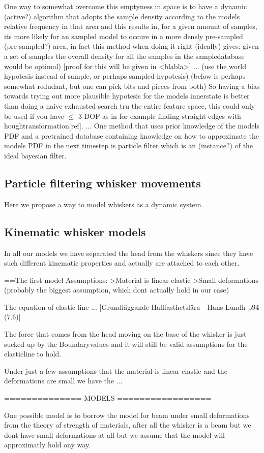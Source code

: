 One way to somewhat overcome this emptyness in space is to have a dynamic (active?) algorithm that adopts the sample density 
according to the models relative frequency in that area and this results in, for a given amount of samples, its more likely 
for an sampled model to occure in a more densly pre-sampled (pre-sampled?) area, in fact this method when doing it right (ideally) 
gives: given a set of samples the overall density for all the samples in the sampledatabase would be optimal) [proof for this will be given in <blabla>]
... (use the world hypotesis instead of sample, or perhaps sampled-hypotesis)
(below is perhaps somewhat redudant, but one can pick bits and pieces from both)
So having a bias towards trying out more plausible hypotesis for the models innerstate is better than 
doing a naive exhausted search tru the entire feature space, this could only be used if you have $\le$ 3 DOF as in for example finding straight edges with houghtransformation[ref].
...
One method that uses prior knowledge of the models PDF and a pretrained database containing knowledge on how to approximate the models PDF in the next timestep is particle filter which is an (instance?) of the ideal bayesian filter.









\subsection{Particle filtering whisker movements}
Here we propose a way to model whiskers as a dynamic system.

\subsection{Kinematic whisker models}

In all our models we have separated the head from the whiskers since they have
such different kinematic properties and actually are attached to each other.

==The first model
Assumptions:
>Material is linear elastic
>Small deformations (probably the biggest assumption, which dont actually hold
in our case)

The equation of elastic line ... [Grundläggande Hållfasthetslära - Hans Lundh
p94 (7.6)]

The force that comes from the head moving on the base of the whisker is just 
sucked up by the Boundaryvalues and it will still be valid assumptions for the
elasticline to hold.

Under just a few assumptions that the material is linear elastic and the
deformations are small we have the ...


============== MODELS =================

One possible model is to borrow the model for beam under small 
deformations from the theory of strength of materials,
after all the whisker is a beam but we dont have small 
deformations at all but we assume that the model will approximatly hold ony way.


